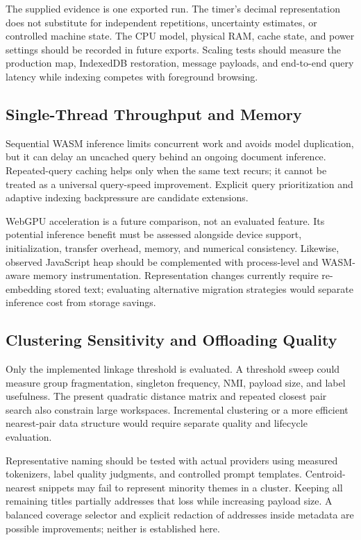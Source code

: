 \documentclass[conference]{IEEEtran}
\begin{document}
The supplied evidence is one exported run. The timer's decimal representation
does not substitute for independent repetitions, uncertainty estimates, or
controlled machine state. The CPU model, physical RAM, cache state, and power
settings should be recorded in future exports. Scaling tests should measure
the production map, IndexedDB restoration, message payloads, and end-to-end
query latency while indexing competes with foreground browsing.

\subsection{Single-Thread Throughput and Memory}
Sequential WASM inference limits concurrent work and avoids model duplication,
but it can delay an uncached query behind an ongoing document inference.
Repeated-query caching helps only when the same text recurs; it cannot be
treated as a universal query-speed improvement. Explicit query prioritization
and adaptive indexing backpressure are candidate extensions.

WebGPU acceleration is a future comparison, not an evaluated feature.
Its potential inference benefit must be assessed alongside device support,
initialization, transfer overhead, memory, and numerical consistency. Likewise,
observed JavaScript heap should be complemented with process-level and
WASM-aware memory instrumentation. Representation changes currently require
re-embedding stored text; evaluating alternative migration strategies would
separate inference cost from storage savings.

\subsection{Clustering Sensitivity and Offloading Quality}
Only the implemented linkage threshold is evaluated. A threshold sweep could
measure group fragmentation, singleton frequency, NMI, payload size, and
label usefulness. The present quadratic distance matrix and repeated closest
pair search also constrain large workspaces. Incremental clustering or a
more efficient nearest-pair data structure would require separate quality
and lifecycle evaluation.

Representative naming should be tested with actual providers using measured
tokenizers, label quality judgments, and controlled prompt templates.
Centroid-nearest snippets may fail to represent minority themes in a cluster.
Keeping all remaining titles partially addresses that loss while increasing
payload size. A balanced coverage selector and explicit redaction of addresses
inside metadata are possible improvements; neither is established here.
\end{document}
